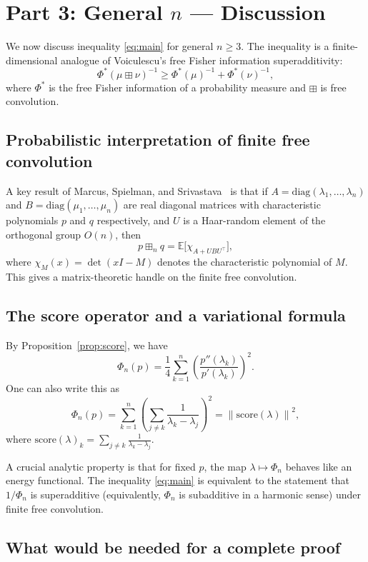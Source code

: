 \documentclass[12pt]{article}
\theoremstyle{definition}
\begin{document}
\section{Part 3: General $n$ — Discussion}

We now discuss inequality \eqref{eq:main} for general $n \geq 3$. The inequality is a finite-dimensional analogue of Voiculescu's free Fisher information superadditivity:
\[
\Phi^*(\mu \boxplus \nu)^{-1} \geq \Phi^*(\mu)^{-1} + \Phi^*(\nu)^{-1},
\]
where $\Phi^*$ is the free Fisher information of a probability measure and $\boxplus$ is free convolution.

\subsection{Probabilistic interpretation of finite free convolution}

A key result of Marcus, Spielman, and Srivastava~\cite{MSS15} is that if $A = \mathrm{diag}(\lambda_1, \dots, \lambda_n)$ and $B = \mathrm{diag}(\mu_1, \dots, \mu_n)$ are real diagonal matrices with characteristic polynomials $p$ and $q$ respectively, and $U$ is a Haar-random element of the orthogonal group $O(n)$, then
\[
p \boxplus_n q = \mathbb{E}\bigl[\chi_{A + UBU^\top}\bigr],
\]
where $\chi_M(x) = \det(xI - M)$ denotes the characteristic polynomial of $M$. This gives a matrix-theoretic handle on the finite free convolution.

\subsection{The score operator and a variational formula}

By Proposition~\ref{prop:score}, we have
\[
\Phi_n(p) = \frac{1}{4}\sum_{k=1}^n \left(\frac{p''(\lambda_k)}{p'(\lambda_k)}\right)^2.
\]
One can also write this as
\[
\Phi_n(p) = \sum_{k=1}^n \left(\sum_{j \neq k} \frac{1}{\lambda_k - \lambda_j}\right)^2 = \left\|\mathrm{score}(\lambda)\right\|^2,
\]
where $\mathrm{score}(\lambda)_k = \sum_{j \neq k} \frac{1}{\lambda_k - \lambda_j}$.

A crucial analytic property is that for fixed $p$, the map $\lambda \mapsto \Phi_n$ behaves like an energy functional. The inequality \eqref{eq:main} is equivalent to the statement that $1/\Phi_n$ is superadditive (equivalently, $\Phi_n$ is subadditive in a harmonic sense) under finite free convolution.

\subsection{What would be needed for a complete proof}
\end{document}
